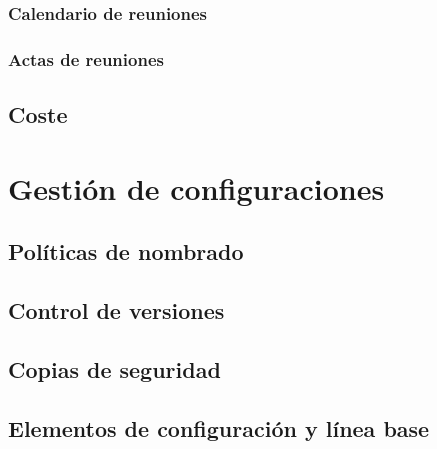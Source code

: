 \documentclass[10pt,spanish]{article}
\let\stdsection\section
\renewcommand\section{\newpage\stdsection}
\begin{document}
\subsubsection{Calendario de reuniones}


\subsubsection{Actas de reuniones}


\subsection{Coste}



\section{Gestión de configuraciones}


\subsection{Políticas de nombrado}


\subsection{Control de versiones}


\subsection{Copias de seguridad}


\subsection{Elementos de configuración y línea base}

\end{document}
